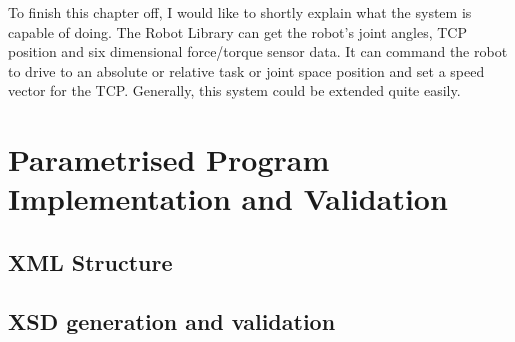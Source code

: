 To finish this chapter off, I would like to shortly explain what the system is capable of doing. The Robot Library can get the robot's joint angles, TCP position and six dimensional force/torque sensor data. It can command the robot to drive to an absolute or relative task or joint space position and set a speed vector for the TCP. Generally, this system could be extended quite easily.

\section{Parametrised Program Implementation and Validation}



\subsection{XML Structure}



\subsection{XSD generation and validation}
